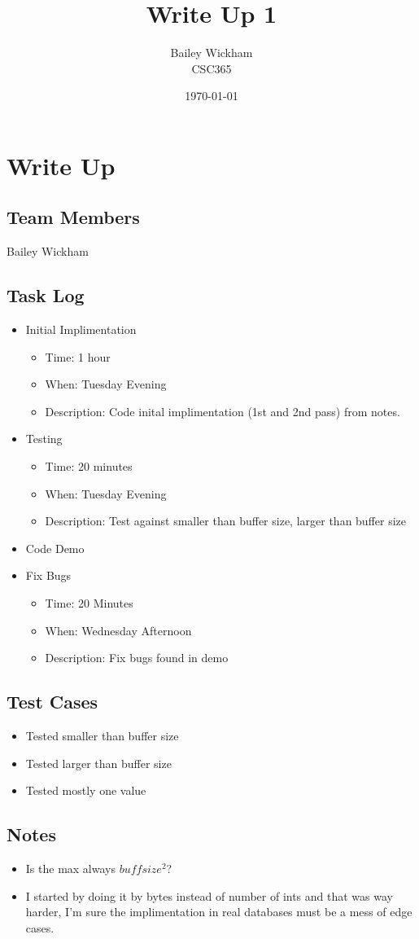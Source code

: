 \documentclass{article}
\title{Write Up 1}
\author{Bailey Wickham \\ CSC365}
\date\today
\begin{document}
\maketitle
\section{Write Up}
\subsection{Team Members}
Bailey Wickham

\subsection{Task Log}
\begin{itemize}
    \item Initial Implimentation
        \begin{itemize}
            \item Time: 1 hour
            \item When: Tuesday Evening
            \item Description: Code inital implimentation (1st and 2nd pass) from notes.
        \end{itemize}
    \item Testing
        \begin{itemize}
            \item Time: 20 minutes
            \item When: Tuesday Evening
            \item Description: Test against smaller than buffer size, larger than buffer size
        \end{itemize}
    \item Code Demo
    \item Fix Bugs
        \begin{itemize}
            \item Time: 20 Minutes
            \item When: Wednesday Afternoon
            \item Description: Fix bugs found in demo
        \end{itemize}
\end{itemize}
\subsection{Test Cases}
\begin{itemize}
    \item Tested smaller than buffer size
    \item Tested larger than buffer size
    \item Tested mostly one value
\end{itemize}
\subsection{Notes}
\begin{itemize}
\item Is the max always $buffsize^2$?
\item I started by doing it by bytes instead of number of ints and that was way harder, I'm sure the implimentation in real databases must be a mess of edge cases.
\end{itemize}
\end{document}
